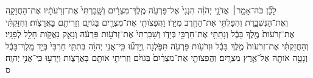 \documentclass{openreader}
\begin{document}
לָכֵ֞ן כֹּה־אָמַ֣ר׀ אֲדֹנָ֣י יְהֹוִ֗ה הִנְנִי֙ אֶל־פַּרְעֹ֣ה מֶֽלֶךְ־מִצְרַ֔יִם וְשָֽׁבַרְתִּי֙ אֶת־זְרֹ֣עֹתָ֔יו אֶת־הַחֲזָקָ֖ה וְאֶת־הַנִּשְׁבָּ֑רֶת וְהִפַּלְתִּ֥י אֶת־הַחֶ֖רֶב מִיָּדֹֽו׃ 
וַהֲפִצֹותִ֥י אֶת־מִצְרַ֖יִם בַּגֹּויִ֑ם וְזֵרִיתִ֖ם בָּאֲרָצֹֽות׃ 
וְחִזַּקְתִּ֗י אֶת־זְרֹעֹות֙ מֶ֣לֶךְ בָּבֶ֔ל וְנָתַתִּ֥י אֶת־חַרְבִּ֖י בְּיָדֹ֑ו וְשָׁבַרְתִּי֙ אֶת־זְרֹעֹ֣ות פַּרְעֹ֔ה וְנָאַ֛ק נַאֲקֹ֥ות חָלָ֖ל לְפָנָֽיו׃ 
וְהַחֲזַקְתִּ֗י אֶת־זְרֹעֹות֙ מֶ֣לֶךְ בָּבֶ֔ל וּזְרֹעֹ֥ות פַּרְעֹ֖ה תִּפֹּ֑לְנָה וְֽיָדְע֞וּ כִּֽי־אֲנִ֣י יְהוָ֗ה בְּתִתִּ֤י חַרְבִּי֙ בְּיַ֣ד מֶֽלֶךְ־בָּבֶ֔ל וְנָטָ֥ה אֹותָ֖הּ אֶל־אֶ֥רֶץ מִצְרָֽיִם׃ 
וַהֲפִצֹותִ֤י אֶת־מִצְרַ֨יִם֙ בַּגֹּויִ֔ם וְזֵרִיתִ֥י אֹותָ֖ם בָּאֲרָצֹ֑ות וְיָדְע֖וּ כִּֽי־אֲנִ֥י יְהוָֽה׃ ס 
\end{document}
